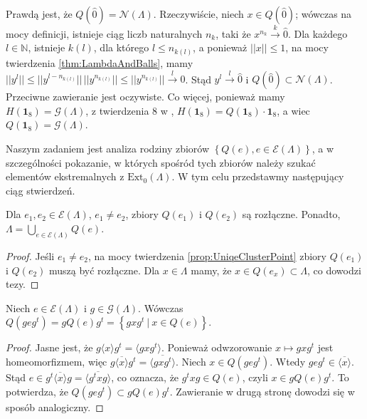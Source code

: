 {\begin{Remark}
    \label{rem:Qof1}
Prawdą jest, że $Q(\hat{0}) = \mathcal{N}(\Lambda)$.
Rzeczywiście, niech $x \in Q(\hat{0})$;
wówczas na mocy definicji,
istnieje ciąg liczb naturalnych $n_{k}$, taki że
$x^{n_{k}} \overset{k}{\rightarrow} \hat{0}$.
Dla każdego $l \in \mathbb{N}$, istnieje $k(l)$, dla którego
$l \leq n_{k(l)}$, a ponieważ
$||x|| \leq 1 $, na mocy twierdzenia \ref{thm:LambdaAndBalls}, mamy
$||y^{l}|| \leq ||y^{l - n_{k(l)}}|| \, ||y^{n_{k(l)}}|| \leq ||y^{n_{k(l)}}||
\overset{l}{\rightarrow} 0$.
Stąd $y^{l} \overset{l}{\rightarrow} \hat{0}$
i $Q(\hat{0}) \subset \mathcal{N}(\Lambda)$.
Przeciwne zawieranie jest oczywiste.
Co więcej, ponieważ mamy $H(\mathbf{1}_{8}) = \mathcal{G}(\Lambda)$,
z twierdzenia 8 w \cite{schwarz1955hausdorff},
$H(\mathbf{1}_{8}) = Q(\mathbf{1}_{8}) \cdot \mathbf{1}_{8}$,
a wiec $Q(\mathbf{1}_{8}) = \mathcal{G}(\Lambda)$.
\end{Remark}

Naszym zadaniem jest analiza rodziny zbiorów
$\left \{ Q(e), e \in \mathcal{E}(\Lambda) \right \}$,
a w szczególności pokazanie, w których spośród tych zbiorów należy szukać
elementów ekstremalnych z
$\text{Ext}_{0}(\Lambda)$.
W tym celu przedstawmy następujący ciąg stwierdzeń.

\begin{Theorem}
    Dla $e_{1}, e_{2} \in \mathcal{E}(\Lambda)$,
    $e_{1} \neq e_{2}$,
    zbiory $Q(e_{1})$ i $Q(e_{2})$ są rozłączne.
Ponadto,
    $\Lambda = \! \bigcup \limits_{e \in \mathcal{E}(\Lambda)} \! Q(e)$.
\end{Theorem}
\begin{proof}
Jeśli $e_{1} \neq e_{2}$, na mocy twierdzenia \ref{prop:UniqeClusterPoint}
zbiory $Q(e_{1})$ i $Q(e_{2})$ muszą być rozłączne.
Dla $x \in \Lambda$ mamy, że $x \in Q(e_{x}) \subset \Lambda$,
co dowodzi tezy.
\end{proof}

\begin{Lemma}
    \label{lem:equivClassesOfQe}
    Niech $e \in \mathcal{E}(\Lambda)$ i $g \in \mathcal{G}(\Lambda)$.
    Wówczas $Q(g e g^{t}) = g Q(e) g^{t} =
    \left \{ g x g^{t} \: | \: x \in Q(e) \right \}$.
\end{Lemma}
\begin{proof}
    Jasne jest, że $g \langle x \rangle g^{t} = \langle g x g^{t} \rangle$.
Ponieważ odwzorowanie $x \mapsto g x g^{t}$ jest homeomorfizmem,
więc $g \overline{\langle x \rangle} g^{t} = \overline{\langle g x g^{t} \rangle}$.
Niech $x \in Q(g e g^{t})$.
Wtedy $g e g^{t} \in \overline{\langle x \rangle}$.
Stąd $e \in g^{t} \overline{\langle x \rangle} g = \overline{\langle g^{t} x g \rangle}$,
co oznacza, że $g^{t} x g \in Q(e)$, czyli
    $x \in g Q(e) g^{t}$.
To potwierdza, że
    $Q(g e g^{t}) \subset g Q(e) g^{t}$.
Zawieranie w drugą stronę dowodzi się w sposób analogiczny.
\end{proof}

}
